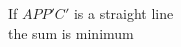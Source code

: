 \documentclass[preview]{standalone}
\begin{document}
\begin{center}
If $A$$PP'$$C'$ is a straight line \\ the sum is minimum
\end{center}
\end{document}
